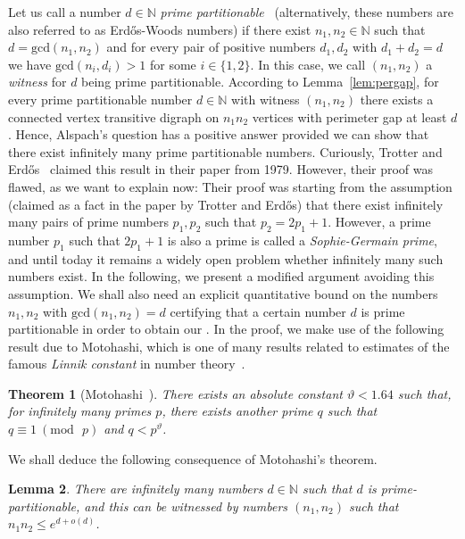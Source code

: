 \documentclass[english,11pt]{article}
\newtheorem{theorem}{Theorem}[section]
\newtheorem{lemma}[theorem]{Lemma}
\theoremstyle{definition}
\numberwithin{equation}{section}
\numberwithin{figure}{section}
\begin{document}
Let us call a number $d\in \mathbb{N}$ \emph{prime partitionable}~\cite{TrotterErdos} (alternatively, these numbers are also referred to as Erd\H{o}s-Woods numbers) if there exist $n_1, n_2\in \mathbb{N}$ such that $d=\mathrm{gcd}(n_1,n_2)$ and for every pair of positive numbers $d_1, d_2$ with $d_1+d_2=d$ we have $\mathrm{gcd}(n_i,d_i)>1$ for some $i\in \{1,2\}$. In this case, we call $(n_1,n_2)$ a \emph{witness} for $d$ being prime partitionable. According to Lemma~\ref{lem:pergap}, for every prime partitionable number $d\in \mathbb{N}$ with witness $(n_1,n_2)$ there exists a connected vertex transitive digraph on $n_1n_2$ vertices with perimeter gap at least $d$. Hence, Alspach's question has a positive answer provided we can show that there exist infinitely many prime partitionable numbers. Curiously, Trotter and Erd\H{o}s~\cite{TrotterErdos} claimed this result in their paper from 1979. However, their proof was flawed, as we want to explain now: Their proof was starting from the assumption (claimed as a fact in the paper by Trotter and Erd\H{o}s) that there exist infinitely many pairs of prime numbers $p_1, p_2$ such that $p_2=2p_1+1$. However, a prime number $p_1$ such that $2p_1+1$ is also a prime is called a \emph{Sophie-Germain prime}, and until today it remains a widely open problem whether infinitely many such numbers exist. %
In the following, we present a modified argument avoiding this assumption. We shall also need an explicit quantitative bound on the numbers $n_1, n_2$ with $\mathrm{gcd}(n_1,n_2)=d$ certifying that a certain number $d$ is prime partitionable in order to obtain our . In the proof, we make use of the following result due to Motohashi, which is one of many results related to estimates of the famous \emph{Linnik constant} in number theory~\cite{linnik1,linnik2}.

\begin{theorem}[Motohashi~\cite{motohashi70}]\label{thm:motohashi}
There exists an absolute constant $\vartheta<1.64$ such that, for infinitely many primes $p$, there exists another prime $q$ such that $q\equiv 1~(\mathrm{mod}\text{ }p)$ and $q<p^\vartheta$. 
\end{theorem}

We shall deduce the following consequence of Motohashi's theorem.

\begin{lemma}\label{lem:primepartitionable}
There are infinitely many numbers $d\in \mathbb{N}$ such that $d$ is prime-partitionable, and this can be witnessed by numbers $(n_1,n_2)$ such that $n_1n_2\le e^{d+o(d)}$. 
\end{lemma}
\end{document}
